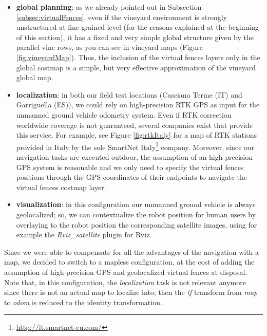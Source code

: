 \begin{itemize}
	\item \textbf{global planning}: as we already pointed out in Subsection \ref{subsec:virtualFences}, even if the vineyard environment is strongly unstructured at fine-grained level (for the reasons explained at the beginning of this section), it has a fixed and very simple global structure given by the parallel vine rows, as you can see in vineyard maps (Figure \ref{fig:vineyardMap}). Thus, the inclusion of the virtual fences layers only in the global costmap is a simple, but very effective approximation of the vineyard global map.
	\item \textbf{localization}: in both our field test locations (Casciana Terme (IT) and Garriguella (ES)), we could rely on high-precision RTK GPS \parencite{rtk} as input for the unmanned ground vehicle odometry system. Even if RTK correction worldwide coverage is not guaranteed, several companies exist that provide this service. For example, see Figure \ref{fig:rtkItaly} for a map of RTK stations provided in Italy by the sole SmartNet Italy\footnote{\url{http://it.smartnet-eu.com/}}
company. Moreover, since our navigation tasks are executed outdoor, the assumption of an high-precision GPS system is reasonable and we only need to specify the virtual fences positions through the GPS coordinates of their endpoints to navigate the virtual fences costmap layer.
	\item \textbf{visualization}: in this configuration our unmanned ground vehicle is always geolocalized; so, we can contextualize the robot position for human users by overlaying to the robot position the corresponding satellite images, using for example the \textit{Rviz\_satellite} plugin for Rviz.
\end{itemize}
Since we were able to compensate for all the advantages of the navigation with a map, we decided to switch to a mapless configuration, at the cost of adding the assumption of high-precision GPS and geolocalized virtual fences at disposal. Note that, in this configuration, the \textit{localization} task is not relevant anymore since there is not an actual map to localize into; then the \textit{tf} transform from \textit{map} to \textit{odom} is reduced to the identity transformation.


